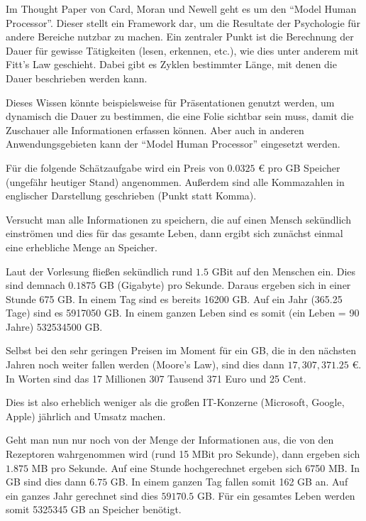 \documentclass[a4paper,10pt]{scrartcl}
\begin{document}
\kopf
\renewcommand{\figurename}{Figure}


Im Thought Paper von Card, Moran und Newell geht es um den "`Model Human Processor"'. Dieser stellt ein Framework dar, um die Resultate der Psychologie für andere Bereiche nutzbar zu machen. Ein zentraler Punkt ist die Berechnung der Dauer für gewisse Tätigkeiten (lesen, erkennen, etc.), wie dies unter anderem mit Fitt's Law geschieht. Dabei gibt es Zyklen bestimmter Länge, mit denen die Dauer beschrieben werden kann.

Dieses Wissen könnte beispielsweise für Präsentationen genutzt werden, um dynamisch die Dauer zu bestimmen, die eine Folie sichtbar sein muss, damit die Zuschauer alle Informationen erfassen können. Aber auch in anderen Anwendungsgebieten kann der "`Model Human Processor"' eingesetzt werden.


Für die folgende Schätzaufgabe wird ein Preis von $0.0325$ \euro{} pro GB Speicher (ungefähr heutiger Stand) angenommen. Außerdem sind alle Kommazahlen in englischer Darstellung geschrieben (Punkt statt Komma).


Versucht man alle Informationen zu speichern, die auf einen Mensch sekündlich einströmen und dies für das gesamte Leben, dann ergibt sich zunächst einmal eine erhebliche Menge an Speicher.

Laut der Vorlesung fließen sekündlich rund $1.5$ GBit auf den Menschen ein. Dies sind demnach $0.1875$ GB (Gigabyte) pro Sekunde. Daraus ergeben sich in einer Stunde 675 GB. In einem Tag sind es bereits 16200 GB. Auf ein Jahr (365.25 Tage) sind es 5917050 GB. In einem ganzen Leben sind es somit (ein Leben = 90 Jahre) 532534500 GB.

Selbst bei den sehr geringen Preisen im Moment für ein GB, die in den nächsten Jahren noch weiter fallen werden (Moore's Law), sind dies dann $17,307,371.25$ \euro{}. In Worten sind das 17 Millionen 307 Tausend 371 Euro und 25 Cent.

Dies ist also erheblich weniger als die großen IT-Konzerne (Microsoft, Google, Apple) jährlich and Umsatz machen.


Geht man nun nur noch von der Menge der Informationen aus, die von den Rezeptoren wahrgenommen wird (rund 15 MBit pro Sekunde), dann ergeben sich $1.875$ MB pro Sekunde. Auf eine Stunde hochgerechnet ergeben sich 6750 MB. In GB sind dies dann $6.75$ GB. In einem ganzen Tag fallen somit 162 GB an. Auf ein ganzes Jahr gerechnet sind dies $59170.5$ GB. Für ein gesamtes Leben werden somit 5325345 GB an Speicher benötigt.
\end{document}
